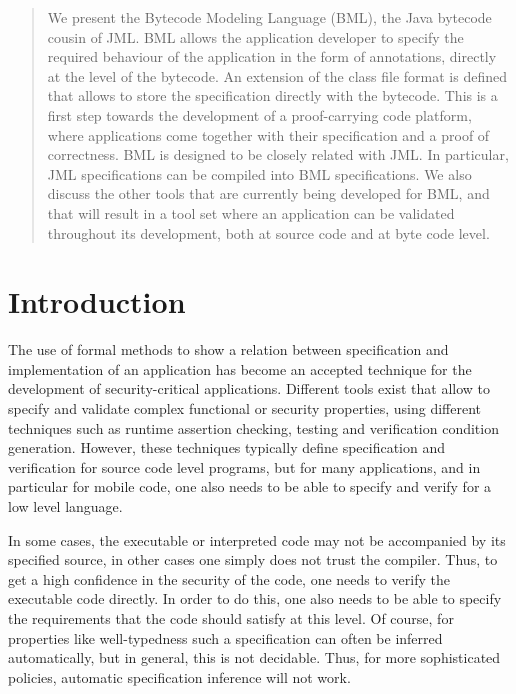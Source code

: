 \begin{abstract} 

We present the Bytecode Modeling Language (BML), the Java bytecode
cousin of JML. BML allows the application developer to specify the
required behaviour of the application in the form of annotations,
directly at the level of the bytecode. An extension of the class file
format is defined that allows to store the specification directly with
the bytecode. This is a first step towards the development of a
proof-carrying code platform, where applications come together with
their specification and a proof of correctness. BML is designed to be
closely related with JML. In particular, JML specifications can be
compiled into BML specifications. We also discuss the other tools that
are currently being developed for BML, and that will result in a tool
set where an application can be validated throughout its development,
both at source code and at byte code level.

\end{abstract}

\section{Introduction}\label{IntroSectLab}

The use of formal methods to show a relation between specification and
implementation of an application has become an accepted technique for
the development of security-critical applications. Different tools
exist that allow to specify and validate complex functional or
security properties, using different techniques such as runtime
assertion checking, testing and verification condition generation.
However, these techniques typically define specification and
verification for source code level programs, but for many
applications, and in particular for mobile code, one also needs to be
able to specify and verify for a low level language.


In some cases, the executable or interpreted code may not be
accompanied by its specified source, in other cases one simply does
not trust the compiler. Thus, to get a high confidence in the security
of the code, one needs to verify the executable code directly. In
order to do this, one also needs to be able to specify the
requirements that the code should satisfy at this level. Of course,
for properties like well-typedness such a specification can often be
inferred automatically, but in general, this is not decidable. Thus,
for more sophisticated policies, automatic specification inference
will not work.

